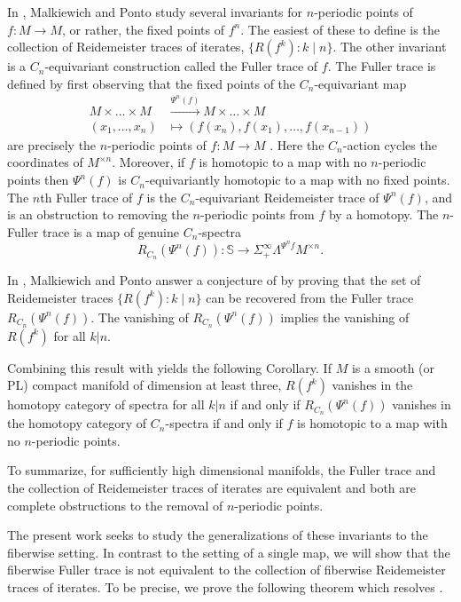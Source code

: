 \documentclass[11pt]{amsart}
\newcommand{\Sph}{\mathbb{S}}
\theoremstyle{plain}   %
\theoremstyle{definition}
\theoremstyle{remark}
\numberwithin{equation}{section}
\begin{document}
In \cite{mp2}, Malkiewich and Ponto study several invariants for $n$-periodic points of $f:M\to M$, or rather, the fixed points of $f^n$. The easiest of these to define is the collection of Reidemeister traces of iterates, $\{R(f^k): k\mid n\}$. The other invariant is a $C_n$-equivariant construction called the Fuller trace of $f$. The Fuller trace is defined by first observing that the fixed points of the $C_n$-equivariant map
\begin{align*}
M\times\dots\times M & \xrightarrow{\Psi^n(f)} M\times \dots \times M\\
(x_1,\dots,x_n) & \mapsto (f(x_n),f(x_1),\dots,f(x_{n-1}))
\end{align*}
are precisely the $n$-periodic points of $f\colon M\to M$ \cite{fuller1967index, dold83}. Here the $C_n$-action cycles the coordinates of $M^{\times n}$. Moreover, if $f$ is homotopic to a map with no $n$-periodic points then $\Psi^n(f)$ is $C_n$-equivariantly homotopic to a map with no fixed points. The $n$th Fuller trace of $f$ is the $C_n$-equivariant Reidemeister trace of $\Psi^n(f)$, and is an obstruction to removing the $n$-periodic points from $f$ by a homotopy. The $n$-Fuller trace is a map of genuine $C_n$-spectra
\[
R_{C_n}(\Psi^n(f))\colon \Sph\to \Sigma_+^\infty \Lambda^{\Psi^nf}M^{\times n}.
\]

In \cite[Corollary 1.3]{mp2}, Malkiewich and Ponto answer a conjecture of \cite{klein_williams_2} by proving that the set of Reidemeister traces $\{R(f^k): k\mid n\}$ can be recovered from the Fuller trace $R_{C_n}(\Psi^n(f))$. The vanishing of $R_{C_n}(\Psi^n(f))$ implies the vanishing of $R(f^k)$ for all $k|n$. 

Combining this result with \cite{jezierski_cancelling} yields the following Corollary. If $M$ is a smooth (or PL) compact manifold of dimension at least three, $R(f^k)$ vanishes in the homotopy category of spectra for all $k|n$ if and only if $R_{C_n}(\Psi^n(f))$ vanishes in the homotopy category of $C_n$-spectra if and only if $f$ is homotopic to a map with no $n$-periodic points. 

To summarize, for sufficiently high dimensional manifolds, the Fuller trace and the collection of Reidemeister traces of iterates are equivalent and both are complete obstructions to the removal of $n$-periodic points. 

The present work seeks to study the generalizations of these invariants to the fiberwise setting. In contrast to the setting of a single map, we will show that the fiberwise Fuller trace is not equivalent to the collection of fiberwise Reidemeister traces of iterates. To be precise, we prove the following theorem which resolves \cite[Conjecture 1.9]{mp2}. 
\end{document}
